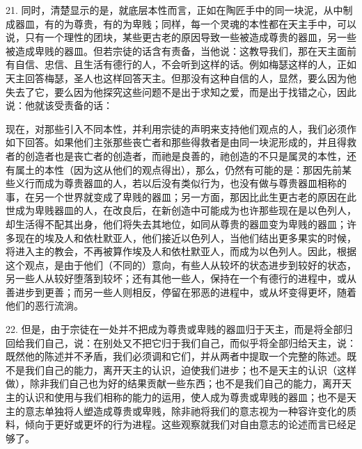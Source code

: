 21. 同时，清楚显示的是，就底层本性而言，正如在陶匠手中的同一块泥，从中制成器皿，有的为尊贵，有的为卑贱；同样，每一个灵魂的本性都在天主手中，可以说，只有一个理性的团块，某些更古老的原因导致一些被造成尊贵的器皿，另一些被造成卑贱的器皿。但若宗徒的话含有责备，当他说：这教导我们，那在天主面前有自信、忠信、且生活有德行的人，不会听到这样的话。例如梅瑟这样的人，正如天主回答梅瑟，圣人也这样回答天主。但那没有这种自信的人，显然，要么因为他失去了它，要么因为他探究这些问题不是出于求知之爱，而是出于找错之心，因此说：他就该受责备的话：\par

现在，对那些引入不同本性，并利用宗徒的声明来支持他们观点的人，我们必须作如下回答。如果他们主张那些丧亡者和那些得救者是由同一块泥形成的，并且得救者的创造者也是丧亡者的创造者，而祂是良善的，祂创造的不只是属灵的本性，还有属土的本性（因为这从他们的观点得出），那么，仍然有可能的是：那因先前某些义行而成为尊贵器皿的人，若以后没有类似行为，也没有做与尊贵器皿相称的事，在另一个世界就变成了卑贱的器皿；另一方面，那因比此生更古老的原因在此世成为卑贱器皿的人，在改良后，在新创造中可能成为也许那些现在是以色列人，却生活得不配其出身，他们将失去其地位，如同从尊贵的器皿变为卑贱的器皿；许多现在的埃及人和依杜默亚人，他们接近以色列人，当他们结出更多果实的时候，将进入主的教会，不再被算作埃及人和依杜默亚人，而成为以色列人。因此，根据这个观点，是由于他们（不同的）意向，有些人从较坏的状态进步到较好的状态，另一些人从较好堕落到较坏；还有其他一些人，保持在一个有德行的进程中，或从善进步到更善；而另一些人则相反，停留在邪恶的进程中，或从坏变得更坏，随着他们的恶行流淌。\par

22. 但是，由于宗徒在一处并不把成为尊贵或卑贱的器皿归于天主，而是将全部归回给我们自己，说：在别处又不把它归于我们自己，而似乎将全部归给天主，说：既然他的陈述并不矛盾，我们必须调和它们，并从两者中提取一个完整的陈述。既不是我们自己的能力，离开天主的认识，迫使我们进步；也不是天主的认识（这样做），除非我们自己也为好的结果贡献一些东西；也不是我们自己的能力，离开天主的认识和使用与我们相称的能力的运用，使人成为尊贵或卑贱的器皿；也不是天主的意志单独将人塑造成尊贵或卑贱，除非祂将我们的意志视为一种容许变化的质料，倾向于更好或更坏的行为进程。这些观察就我们对自由意志的论述而言已经足够了。\par

